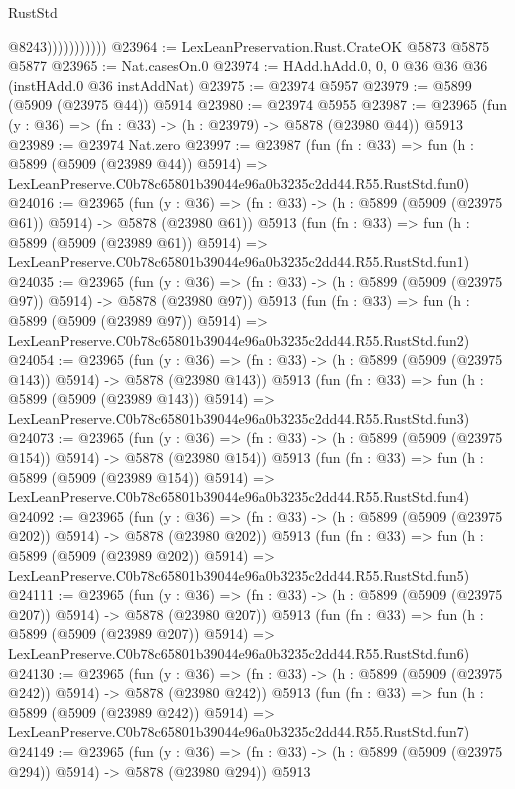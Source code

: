 \begin{lexlean}{RustStd}
\begin{coremodule}
{{                          @8243)))))))))))
@23964 := LexLeanPreservation.Rust.CrateOK @5873 @5875 @5877
@23965 := Nat.casesOn.{0}
@23974 := HAdd.hAdd.{0, 0, 0} @36 @36 @36 (instHAdd.{0} @36 instAddNat)
@23975 := @23974 @5957
@23979 := @5899 (@5909 (@23975 @44)) @5914
@23980 := @23974 @5955
@23987 := @23965 (fun (y : @36) => (fn : @33) -> (h : @23979) -> @5878 (@23980 @44)) @5913
@23989 := @23974 Nat.zero
@23997 := @23987
    (fun (fn : @33) =>
    fun (h : @5899 (@5909 (@23989 @44)) @5914) =>
    LexLeanPreserve.C0b78c65801b39044e96a0b3235c2dd44.R55.RustStd.fun0)
@24016 := @23965
    (fun (y : @36) => (fn : @33) -> (h : @5899 (@5909 (@23975 @61)) @5914) -> @5878 (@23980 @61))
    @5913
    (fun (fn : @33) =>
    fun (h : @5899 (@5909 (@23989 @61)) @5914) =>
    LexLeanPreserve.C0b78c65801b39044e96a0b3235c2dd44.R55.RustStd.fun1)
@24035 := @23965
    (fun (y : @36) => (fn : @33) -> (h : @5899 (@5909 (@23975 @97)) @5914) -> @5878 (@23980 @97))
    @5913
    (fun (fn : @33) =>
    fun (h : @5899 (@5909 (@23989 @97)) @5914) =>
    LexLeanPreserve.C0b78c65801b39044e96a0b3235c2dd44.R55.RustStd.fun2)
@24054 := @23965
    (fun (y : @36) => (fn : @33) -> (h : @5899 (@5909 (@23975 @143)) @5914) -> @5878 (@23980 @143))
    @5913
    (fun (fn : @33) =>
    fun (h : @5899 (@5909 (@23989 @143)) @5914) =>
    LexLeanPreserve.C0b78c65801b39044e96a0b3235c2dd44.R55.RustStd.fun3)
@24073 := @23965
    (fun (y : @36) => (fn : @33) -> (h : @5899 (@5909 (@23975 @154)) @5914) -> @5878 (@23980 @154))
    @5913
    (fun (fn : @33) =>
    fun (h : @5899 (@5909 (@23989 @154)) @5914) =>
    LexLeanPreserve.C0b78c65801b39044e96a0b3235c2dd44.R55.RustStd.fun4)
@24092 := @23965
    (fun (y : @36) => (fn : @33) -> (h : @5899 (@5909 (@23975 @202)) @5914) -> @5878 (@23980 @202))
    @5913
    (fun (fn : @33) =>
    fun (h : @5899 (@5909 (@23989 @202)) @5914) =>
    LexLeanPreserve.C0b78c65801b39044e96a0b3235c2dd44.R55.RustStd.fun5)
@24111 := @23965
    (fun (y : @36) => (fn : @33) -> (h : @5899 (@5909 (@23975 @207)) @5914) -> @5878 (@23980 @207))
    @5913
    (fun (fn : @33) =>
    fun (h : @5899 (@5909 (@23989 @207)) @5914) =>
    LexLeanPreserve.C0b78c65801b39044e96a0b3235c2dd44.R55.RustStd.fun6)
@24130 := @23965
    (fun (y : @36) => (fn : @33) -> (h : @5899 (@5909 (@23975 @242)) @5914) -> @5878 (@23980 @242))
    @5913
    (fun (fn : @33) =>
    fun (h : @5899 (@5909 (@23989 @242)) @5914) =>
    LexLeanPreserve.C0b78c65801b39044e96a0b3235c2dd44.R55.RustStd.fun7)
@24149 := @23965
    (fun (y : @36) => (fn : @33) -> (h : @5899 (@5909 (@23975 @294)) @5914) -> @5878 (@23980 @294))
    @5913
}}
\end{coremodule}
\end{lexlean}
